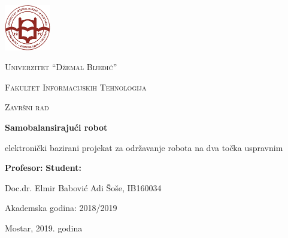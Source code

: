 \documentclass[../Document.tex]{subfiles}
\begin{document}
\begin{titlepage}
    \centering
    \includegraphics[width=0.15\textwidth]{Images/Logo_UNMO.png}\par
    \vspace{1cm}
    {\scshape\LARGE Univerzitet ``Džemal Bijedić'' \par}
    {\scshape\Large Fakultet Informacijskih Tehnologija \par}

    \vspace{2.5cm}
    {\scshape\Large Završni rad\par}
    \vspace{0.7cm}

    {\huge\bfseries Samobalansirajući robot\par}
    \vspace{0.5cm}
    elektronički bazirani projekat za održavanje robota na dva točka uspravnim\par

    \vfill

    \textbf{Profesor:}
    \hfill
    \textbf{{Student:}}\par
    Doc.dr. Elmir Babović
    \hfill
    Adi Šoše, IB160034\par

    \vspace{1cm}
    Akademska godina: 2018/2019\par
    \vspace{0.3cm}
    Mostar, 2019. godina
\end{titlepage}
\restoregeometry
\end{document}
